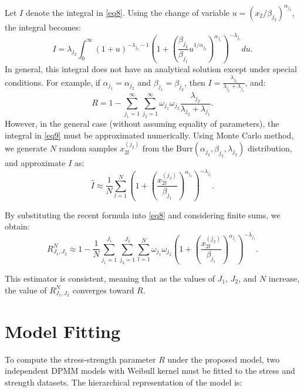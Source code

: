 \documentclass[twoside]{article}
\begin{document}
Let \(I\) denote the integral in \eqref{eq8}. Using the change of variable \(u = (x_2/\beta_{j_2})^{\alpha_{j_2}}\), the integral becomes:
\begin{equation}\label{eq9}
I = \lambda_{j_2} \int_0^\infty (1 + u)^{-\lambda_{j_2}-1} \left(1 + \left(\frac{\beta_{j_2}}{\beta_{j_1}} u^{1/\alpha_{j_2}}\right)^{\alpha_{j_1}}\right)^{-\lambda_{j_1}} du.
\end{equation}
In general, this integral does not have an analytical solution except under special conditions. For example, if \(\alpha_{j_1} = \alpha_{j_2}\) and \(\beta_{j_1} = \beta_{j_2}\), then \(I = \frac{\lambda_{j_2}}{\lambda_{j_2} + \lambda_{j_1}}\), and:
\begin{equation}\label{eq10}
R = 1 - \sum_{j_1=1}^{\infty} \sum_{j_2=1}^{\infty} \omega_{j_1} \omega_{j_2} \frac{\lambda_{j_2}}{\lambda_{j_2} + \lambda_{j_1}}.
\end{equation}
However, in the general case (without assuming equality of parameters), the integral in \eqref{eq9} must be approximated numerically. Using Monte Carlo method, we generate \(N\) random samples \(x_{2l}^{(j_2)}\) from the \(\text{Burr}(\alpha_{j_2}, \beta_{j_2}, \lambda_{j_2})\) distribution, and approximate \(I\) as:
\begin{equation}\label{eq11}
\hat{I} \approx \frac{1}{N} \sum_{l=1}^{N} \left(1 + \left(\frac{x_{2l}^{(j_2)}}{\beta_{j_1}}\right)^{\alpha_{j_1}}\right)^{-\lambda_{j_1}}.
\end{equation}

By substituting the recent formula into \eqref{eq8} and considering finite sums, we obtain:
\begin{equation}\label{eq13}
R_{J_1, J_2}^{N} \approx 1 - \frac{1}{N} \sum_{j_1=1}^{J_1} \sum_{j_2=1}^{J_2} \sum_{l=1}^{N} \omega_{j_1} \omega_{j_2} \left(1 + \left(\frac{x_{2l}^{(j_2)}}{\beta_{j_1}}\right)^{\alpha_{j_1}}\right)^{-\lambda_{j_1}}.
\end{equation}
 
 This estimator is consistent, meaning that as the values of  $J_1$, $J_2$, and $N$ increase, the value of $R_{J_1, J_2}^{N}$ converges toward $R$.
 
\section{Model Fitting}
To compute the stress-strength parameter \(R\) under the proposed model, two independent DPMM models with Weibull kernel must be fitted to the stress and strength datasets. The hierarchical representation of the model is:
\end{document}
